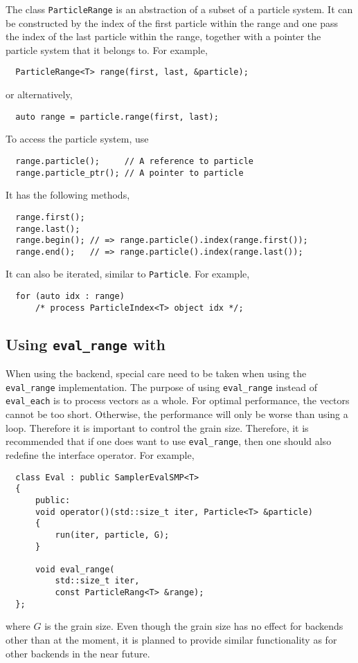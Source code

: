 The class \verb|ParticleRange| is an abstraction of a subset of a particle
system. It can be constructed by the index of the first particle within the
range and one pass the index of the last particle within the range, together
with a pointer the particle system that it belongs to. For example,
\begin{Verbatim}
  ParticleRange<T> range(first, last, &particle);
\end{Verbatim}
or alternatively,
\begin{Verbatim}
  auto range = particle.range(first, last);
\end{Verbatim}
To access the particle system, use
\begin{Verbatim}
  range.particle();     // A reference to particle
  range.particle_ptr(); // A pointer to particle
\end{Verbatim}
It has the following methods,
\begin{Verbatim}
  range.first();
  range.last();
  range.begin(); // => range.particle().index(range.first());
  range.end();   // => range.particle().index(range.last());
\end{Verbatim}
It can also be iterated, similar to \verb|Particle|. For example,
\begin{Verbatim}
  for (auto idx : range)
      /* process ParticleIndex<T> object idx */;
\end{Verbatim}

\subsection{Using \texttt{eval\_range} with \tbb}

When using the \tbb backend, special care need to be taken when using the
\verb|eval_range| implementation. The purpose of using \verb|eval_range|
instead of \verb|eval_each| is to process vectors as a whole. For optimal
performance, the vectors cannot be too short. Otherwise, the performance will
only be worse than using a loop. Therefore it is important to control the grain
size. Therefore, it is recommended that if one does want to use
\verb|eval_range|, then one should also redefine the interface operator. For
example,
\begin{Verbatim}
  class Eval : public SamplerEvalSMP<T>
  {
      public:
      void operator()(std::size_t iter, Particle<T> &particle)
      {
          run(iter, particle, G);
      }

      void eval_range(
          std::size_t iter,
          const ParticleRang<T> &range);
  };
\end{Verbatim}
where $G$ is the grain size. Even though the grain size has no effect for
backends other than \tbb at the moment, it is planned to provide similar
functionality as \tbb for other backends in the near future.

